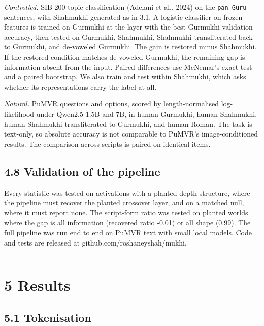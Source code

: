 \emph{Controlled.} SIB-200 topic classification (Adelani et al., 2024)
on the \texttt{pan\_Guru} sentences, with Shahmukhi generated as in 3.1.
A logistic classifier on frozen features is trained on Gurmukhi at the
layer with the best Gurmukhi validation accuracy, then tested on
Gurmukhi, Shahmukhi, Shahmukhi transliterated back to Gurmukhi, and
de-voweled Gurmukhi. The gain is restored minus Shahmukhi. If the
restored condition matches de-voweled Gurmukhi, the remaining gap is
information absent from the input. Paired differences use McNemar's
exact test and a paired bootstrap. We also train and test within
Shahmukhi, which asks whether its representations carry the label at
all.

\emph{Natural.} PuMVR questions and options, scored by length-normalised
log-likelihood under Qwen2.5 1.5B and 7B, in human Gurmukhi, human
Shahmukhi, human Shahmukhi transliterated to Gurmukhi, and human Roman.
The task is text-only, so absolute accuracy is not comparable to PuMVR's
image-conditioned results. The comparison across scripts is paired on
identical items.

\hypertarget{validation-of-the-pipeline}{%
\subsection{4.8 Validation of the
pipeline}\label{validation-of-the-pipeline}}

Every statistic was tested on activations with a planted depth
structure, where the pipeline must recover the planted crossover layer,
and on a matched null, where it must report none. The script-form ratio
was tested on planted worlds where the gap is all information (recovered
ratio -0.01) or all shape (0.99). The full pipeline was run end to end
on PuMVR text with small local models. Code and tests are released at
github.com/roshaneyshah/mukhi.

\begin{center}\rule{0.5\linewidth}{0.5pt}\end{center}

\hypertarget{results}{%
\section{5 Results}\label{results}}

\hypertarget{tokenisation}{%
\subsection{5.1 Tokenisation}\label{tokenisation}}

